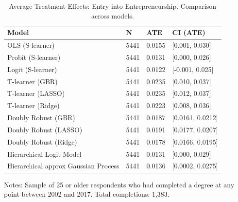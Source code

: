 \documentclass[12pt, a4paper]{article}
\begin{document}
\clearpage
\begin{table}[H]
\centering
\small
\caption{Average Treatment Effects: Entry into Entrepreneurship. Comparison across models.}
\begin{tabular}{p{} C{0.1\textwidth} C{0.1\textwidth} C{0.2\textwidth}}
\toprule
Model  &  N  &  ATE  &  CI (ATE)  \\
\midrule 	   						
OLS (S-learner)	 & 5441 & 0.0155 & [0.001, 0.030] \\
Probit (S-learner)	 & 5441 & 0.0131 & [0.000, 0.026] \\
Logit (S-learner)	 & 5441 & 0.0122 & [-0.001, 0.025] \\
T-learner (GBR) & 5441 & 0.0235 & [0.010, 0.037]	 \\
T-learner (LASSO) & 5441 & 0.0235 & [0.012, 0.037]	 \\
T-learner (Ridge)	 & 5441 & 0.0223 & [0.008, 0.036]	 \\
Doubly Robust (GBR) & 5441 & 0.0187 & [0.0161, 0.0212] \\
Doubly Robust (LASSO) & 5441 & 0.0191 & [0.0177, 0.0207]	 \\
Doubly Robust (Ridge)	 & 5441 & 0.0178 & [0.0166, 0.0195]	 \\
Hierarchical Logit Model	 & 5441 & 0.0131 & [0.000, 0.029]  \\
Hierarchical approx Gaussian Process  & 5441 & 0.0136 & [0.0002, 0.0275] \\
\bottomrule
\end{tabular}
\par\medskip
\parbox{1.0\textwidth}{\footnotesize Notes: Sample of 25 or older respondents who had completed a degree at any point between 2002 and 2017. Total completions: 1,383.}
\label{tab:atebsentrep}
\end{table}
\end{document}
